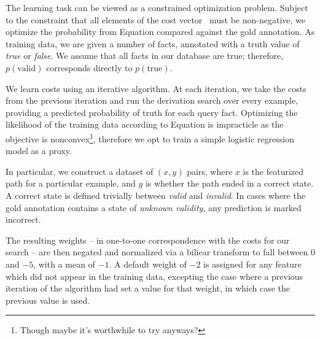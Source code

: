 The learning task can be viewed as a constrained optimization problem.
Subject to the constraint that all elements of the cost vector \btheta\ 
  must be non-negative, we optimize the probability from
  Equation  compared against the gold annotation.
As training data, we are given a number of facts, annotated with a
  truth value of \textit{true} or \textit{false}.
We assume that all facts in our database are true; therefore,
  $p(\textrm{valid})$ corresponds directly to $p(\textrm{true})$.

We learn costs using an iterative algorithm.
At each iteration, we take the costs from the previous iteration
  and run the derivation search over every example, providing
  a predicted probability of truth for each query fact.
Optimizing the likelihood of the training data according to
  Equation  is impracticle as the objective is nonconvex\footnote{
    Though maybe it's worthwhile to try anyways?
  }, therefore we opt to train a simple logistic regression model
  as a proxy.

In particular, we construct a dataset of $(x,y)$ pairs, where $x$ is the
  featurized path for a particular example, and $y$ is whether the
  path ended in a correct state.
A correct state is defined trivially between \textit{valid} and
  \textit{invalid}.
In cases where the gold annotation contains a state of 
  \textit{unknown validity}, any prediction is marked incorrect.

The resulting weights -- in one-to-one correspondence with the costs
  for our search -- are then negated and normalized via a biliear
  transform to fall between 0 and $-5$, with a mean of $-1$.
A default weight of $-2$ is assigned for any feature which did not
  appear in the training data, excepting the case where a previous
  iteration of the algorithm had set a value for that weight, in
  which case the previous value is used.
